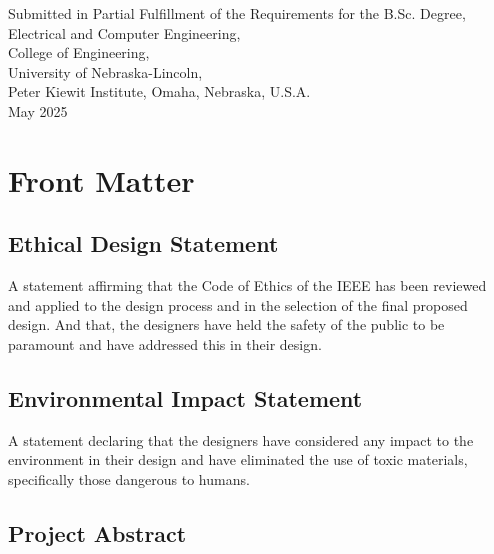 \documentclass[12pt]{article}
\begin{document}
\begin{titlepage}
\begin{center}
        \vspace{3cm}
        
        \small Submitted in Partial Fulfillment of the Requirements for the B.Sc. Degree,\\
        \small Electrical and Computer Engineering,\\
        \small College of Engineering,\\
        \small University of Nebraska-Lincoln,\\
        \small Peter Kiewit Institute, Omaha, Nebraska, U.S.A.\\
        \small May 2025\\
    \end{center}
    \thispagestyle{empty}
\end{titlepage}

\newpage

\onehalfspacing
\section*{Front Matter}

\subsection*{Ethical Design Statement}
A statement affirming that the Code of Ethics of the IEEE has been reviewed and applied to the design process and in the selection of the final proposed design. And that, the designers have held the safety of the public to be paramount and have addressed this in their design.

\subsection*{Environmental Impact Statement}
A statement declaring that the designers have considered any impact to the environment in their design and have eliminated the use of toxic materials, specifically those dangerous to humans.

\subsection*{Project Abstract}
\end{document}
